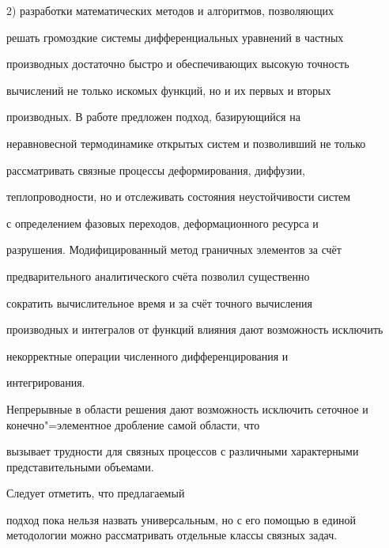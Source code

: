 2) разработки математических методов и алгоритмов, позволяющих

решать громоздкие системы дифференциальных уравнений в частных

производных достаточно быстро и обеспечивающих высокую точность

вычислений не только искомых функций, но и их первых и вторых

производных. В работе предложен подход, базирующийся на

неравновесной термодинамике открытых систем и позволивший не только

рассматривать  связные процессы деформирования, диффузии,

теплопроводности, но и отслеживать состояния неустойчивости систем

с определением фазовых переходов, деформационного ресурса и

разрушения. Модифицированный метод граничных элементов за счёт

предварительного аналитического счёта позволил существенно

сократить вычислительное время и за счёт точного вычисления

производных и интегралов от функций влияния дают возможность исключить

некорректные операции численного дифференцирования и

интегрирования. 

Непрерывные в области решения дают возможность  исключить сеточное и конечно"=элементное дробление самой области, что

вызывает трудности для связных процессов с различными характерными представительными объемами. 

Следует отметить, что предлагаемый

подход пока нельзя назвать универсальным, но с его помощью в единой методологии можно рассматривать отдельные классы связных задач.






